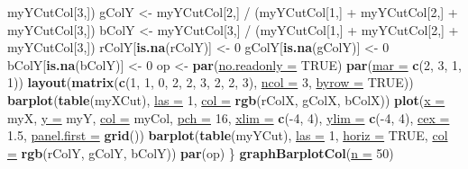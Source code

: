 \documentclass[twoside,symmetric]{book}
\newenvironment{Shaded}{}{}
\newcommand{\DataTypeTok}[1]{\underline{#1}}
\newcommand{\DecValTok}[1]{#1}
\newcommand{\FloatTok}[1]{#1}
\newcommand{\KeywordTok}[1]{\textbf{#1}}
\newcommand{\NormalTok}[1]{#1}
\newcommand{\OperatorTok}[1]{#1}
\newcommand{\OtherTok}[1]{#1}
\newcommand{\StringTok}[1]{#1}
\begin{document}
\begin{Shaded}
\begin{Highlighting}[]
\StringTok{    }\NormalTok{myYCutCol[}\DecValTok{3}\NormalTok{,])}
\NormalTok{  gColY <-}\StringTok{ }\NormalTok{myYCutCol[}\DecValTok{2}\NormalTok{,] }\OperatorTok{/}\StringTok{ }\NormalTok{(myYCutCol[}\DecValTok{1}\NormalTok{,] }\OperatorTok{+}\StringTok{ }\NormalTok{myYCutCol[}\DecValTok{2}\NormalTok{,] }\OperatorTok{+}\StringTok{ }
\StringTok{    }\NormalTok{myYCutCol[}\DecValTok{3}\NormalTok{,])}
\NormalTok{  bColY <-}\StringTok{ }\NormalTok{myYCutCol[}\DecValTok{3}\NormalTok{,] }\OperatorTok{/}\StringTok{ }\NormalTok{(myYCutCol[}\DecValTok{1}\NormalTok{,] }\OperatorTok{+}\StringTok{ }\NormalTok{myYCutCol[}\DecValTok{2}\NormalTok{,] }\OperatorTok{+}\StringTok{ }
\StringTok{    }\NormalTok{myYCutCol[}\DecValTok{3}\NormalTok{,])}
\NormalTok{  rColY[}\KeywordTok{is.na}\NormalTok{(rColY)] <-}\StringTok{ }\DecValTok{0}
\NormalTok{  gColY[}\KeywordTok{is.na}\NormalTok{(gColY)] <-}\StringTok{ }\DecValTok{0}
\NormalTok{  bColY[}\KeywordTok{is.na}\NormalTok{(bColY)] <-}\StringTok{ }\DecValTok{0}
\NormalTok{  op <-}\StringTok{ }\KeywordTok{par}\NormalTok{(}\DataTypeTok{no.readonly =} \OtherTok{TRUE}\NormalTok{)}
  \KeywordTok{par}\NormalTok{(}\DataTypeTok{mar =} \KeywordTok{c}\NormalTok{(}\DecValTok{2}\NormalTok{, }\DecValTok{3}\NormalTok{, }\DecValTok{1}\NormalTok{, }\DecValTok{1}\NormalTok{))}
  \KeywordTok{layout}\NormalTok{(}\KeywordTok{matrix}\NormalTok{(}\KeywordTok{c}\NormalTok{(}\DecValTok{1}\NormalTok{, }\DecValTok{1}\NormalTok{, }\DecValTok{0}\NormalTok{, }
                  \DecValTok{2}\NormalTok{, }\DecValTok{2}\NormalTok{, }\DecValTok{3}\NormalTok{, }
                  \DecValTok{2}\NormalTok{, }\DecValTok{2}\NormalTok{, }\DecValTok{3}\NormalTok{), }\DataTypeTok{ncol =} \DecValTok{3}\NormalTok{, }\DataTypeTok{byrow =} \OtherTok{TRUE}\NormalTok{))}
  \KeywordTok{barplot}\NormalTok{(}\KeywordTok{table}\NormalTok{(myXCut), }\DataTypeTok{las =} \DecValTok{1}\NormalTok{, }\DataTypeTok{col =} \KeywordTok{rgb}\NormalTok{(rColX, gColX, bColX))}
  \KeywordTok{plot}\NormalTok{(}\DataTypeTok{x =}\NormalTok{ myX, }\DataTypeTok{y =}\NormalTok{ myY, }\DataTypeTok{col =}\NormalTok{ myCol, }\DataTypeTok{pch =} \DecValTok{16}\NormalTok{, }
    \DataTypeTok{xlim =} \KeywordTok{c}\NormalTok{(}\OperatorTok{-}\DecValTok{4}\NormalTok{, }\DecValTok{4}\NormalTok{), }\DataTypeTok{ylim =} \KeywordTok{c}\NormalTok{(}\OperatorTok{-}\DecValTok{4}\NormalTok{, }\DecValTok{4}\NormalTok{), }\DataTypeTok{cex =} \FloatTok{1.5}\NormalTok{, }
    \DataTypeTok{panel.first =} \KeywordTok{grid}\NormalTok{())}
  \KeywordTok{barplot}\NormalTok{(}\KeywordTok{table}\NormalTok{(myYCut), }\DataTypeTok{las =} \DecValTok{1}\NormalTok{, }\DataTypeTok{horiz =} \OtherTok{TRUE}\NormalTok{, }
    \DataTypeTok{col =} \KeywordTok{rgb}\NormalTok{(rColY, gColY, bColY))}
  \KeywordTok{par}\NormalTok{(op)}
\NormalTok{\}}
\KeywordTok{graphBarplotCol}\NormalTok{(}\DataTypeTok{n =} \DecValTok{50}\NormalTok{)}
\end{Highlighting}
\end{Shaded}
\end{document}
